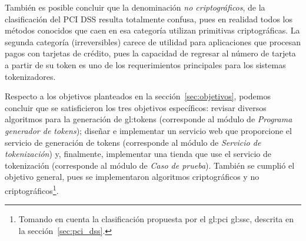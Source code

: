 También es posible concluir que la denominación \textit{no criptográficos}, de
la clasificación del PCI DSS resulta totalmente confusa, pues en realidad todos
los métodos conocidos que caen en esa categoría utilizan primitivas
criptográficas. La segunda categoría (irreversibles) carece de utilidad para
aplicaciones que procesan pagos con tarjetas de crédito, pues la capacidad de
regresar al número de tarjeta a partir de su token es uno de los requerimientos
principales para los sistemas tokenizadores.

Respecto a los objetivos planteados en la sección~\ref{sec:objetivos}, podemos
concluir que se satisficieron los tres objetivos específicos: revisar diversos
algoritmos para la generación de \glspl{gl:token} (corresponde al módulo de
\textit{Programa generador de tokens}); diseñar e implementar un servicio web
que proporcione el servicio de generación de tokens (corresponde al módulo de
\textit{Servicio de tokenización}) y, finalmente, implementar una tienda que
use el servicio de tokenización (corresponde al módulo de \textit{Caso de
prueba}). También se cumplió el objetivo general, pues se implementaron
algoritmos criptográficos y no criptográficos\footnote{Tomando en cuenta la
clasificación propuesta por el \gls{gl:pci} \gls{gl:ssc}, descrita en la
sección~\ref{sec:pci_dss}.}.
